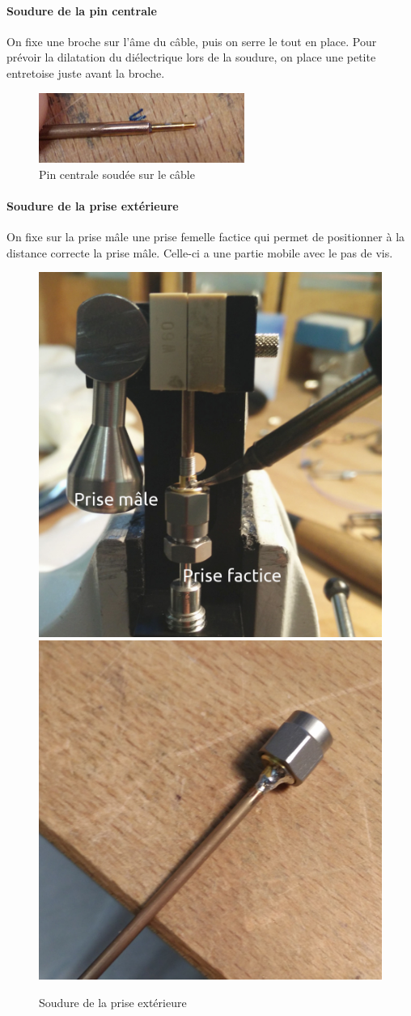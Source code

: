 \paragraph*{Soudure de la pin centrale} On fixe une broche sur l’âme du câble, puis on serre le tout en
place. Pour prévoir la dilatation du diélectrique lors de la soudure, on place une petite entretoise juste avant la broche.
\begin{figure}[h]
    \begin{center}
        \includegraphics[width=0.60\textwidth]{Images/Coax/3}
        \caption{Pin centrale soudée sur le câble}
        \label{coax_soudure_centre}
    \end{center}
\end{figure}

\paragraph*{Soudure de la prise extérieure} On fixe sur la prise mâle une prise femelle factice qui permet de positionner à la distance correcte la prise mâle. Celle-ci a une partie mobile avec le pas de vis.
\begin{figure}[ht]
    \begin{center}
        \includegraphics[height=0.48\textwidth]{Images/Coax/4}
        \quad
        \includegraphics[height=0.48\textwidth]{Images/Coax/5}
        \caption{Soudure de la prise extérieure}
        \label{coax_soudure_exterieur}
    \end{center}
\end{figure}

